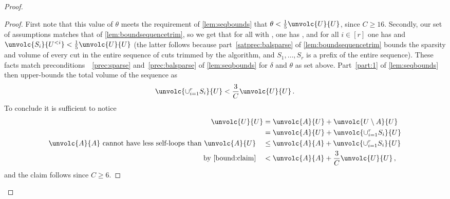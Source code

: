 \begin{proof}
\begin{proof}
		First note that this value of $\theta$ meets the requirement of \cref{lem:seqbounds} that $\theta< \frac{1}{5}\unvolc{U}{U}$, since $C \ge 16$. Secondly, our set of assumptions matches that of \cref{lem:boundsequencetrim}, so we get that for all  with , one has , and for all $i \in [r]$ one has  and $ \unvolc{S_i}{U^{<i}} < \frac{1}{5}\unvolc{U}{U}$ (the latter follows because part~\eqref{satprec:balsparse} of \cref{lem:boundsequencetrim} bounds the sparsity and volume of every cut in the entire sequence of cuts trimmed by the algorithm, and $S_1,\dots,S_r$ is a prefix of the entire sequence). These facts match preconditions~~\eqref{prec:sparse} and~\eqref{prec:balsparse} of \cref{lem:seqbounds} for $\delta$ and $\theta$ as set above. Part~\eqref{part:1} of \cref{lem:seqbounds} then upper-bounds the total volume of the sequence as
		\begin{equation}
			\label{bound:claim}
			\unvolc{\cup_{i=1}^{r} S_i}{U} < \frac{3}{C}\unvolc{U}{U} \, .
		\end{equation}
		To conclude it is sufficient to notice
		\begin{align*}
			\unvolc{U}{U} & = \unvolc{A}{U}+\unvolc{U \setminus A}{U}\\
			& = \unvolc{A}{U}+\unvolc{\cup_{i =1}^r S_i}{U} \\
			\text{$\unvolc{A}{A}$ cannot have less self-loops than $\unvolc{A}{U}$}\quad& \le \unvolc{A}{A}+\unvolc{\cup_{i =1}^r S_i}{U} \\
			\text{by~\eqref{bound:claim}}\quad & < \unvolc{A}{A}+\frac{3}{C}\unvolc{U}{U} \, ,
		\end{align*}
	and the claim follows since $C \ge 6$.
	\end{proof}
	

\end{proof}
